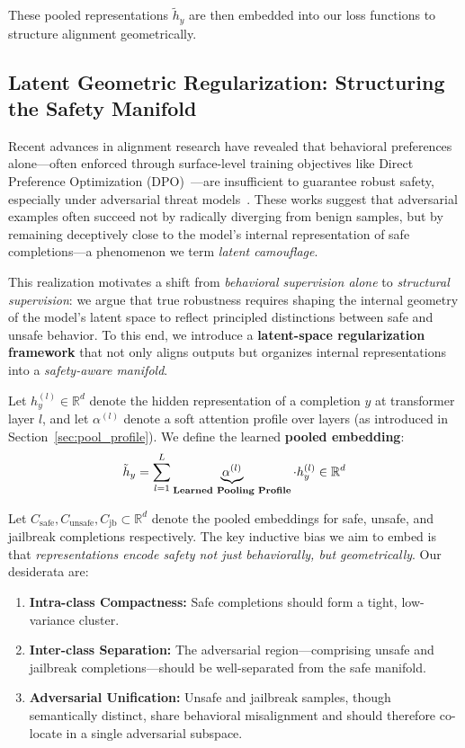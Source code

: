 These pooled representations \( \tilde{h}_y \) are then embedded into our loss functions to structure alignment geometrically.

\subsection{Latent Geometric Regularization: Structuring the Safety Manifold}

Recent advances in alignment research have revealed that behavioral preferences alone—often enforced through surface-level training objectives like Direct Preference Optimization (DPO)~\cite{rafailov2023direct}—are insufficient to guarantee robust safety, especially under adversarial threat models~\cite{turpin2023llms, zhu2024promptbench}. These works suggest that adversarial examples often succeed not by radically diverging from benign samples, but by remaining deceptively close to the model’s internal representation of safe completions—a phenomenon we term \textit{latent camouflage}.

This realization motivates a shift from \emph{behavioral supervision alone} to \emph{structural supervision}: we argue that true robustness requires shaping the internal geometry of the model’s latent space to reflect principled distinctions between safe and unsafe behavior. To this end, we introduce a \textbf{latent-space regularization framework} that not only aligns outputs but organizes internal representations into a \emph{safety-aware manifold}.

Let \( h^{(l)}_y \in \mathbb{R}^d \) denote the hidden representation of a completion \( y \) at transformer layer \( l \), and let \( \alpha^{(l)} \) denote a soft attention profile over layers (as introduced in Section~\ref{sec:pool_profile}). We define the learned \textbf{pooled embedding}:
\[
\tilde{h}_y = \sum_{l=1}^L \underbrace{\alpha^{(l)}}_{\text{\textbf{Learned Pooling Profile}}} \cdot h_y^{(l)} \in \mathbb{R}^d
\]

Let \( C_{\mathrm{safe}}, C_{\mathrm{unsafe}}, C_{\mathrm{jb}} \subset \mathbb{R}^d \) denote the pooled embeddings for safe, unsafe, and jailbreak completions respectively. The key inductive bias we aim to embed is that \emph{representations encode safety not just behaviorally, but geometrically}. Our desiderata are:

\begin{enumerate}[leftmargin=1.5em]
    \item \textbf{Intra-class Compactness:} Safe completions should form a tight, low-variance cluster.
    \item \textbf{Inter-class Separation:} The adversarial region—comprising unsafe and jailbreak completions—should be well-separated from the safe manifold.
    \item \textbf{Adversarial Unification:} Unsafe and jailbreak samples, though semantically distinct, share behavioral misalignment and should therefore co-locate in a single adversarial subspace.
\end{enumerate}

